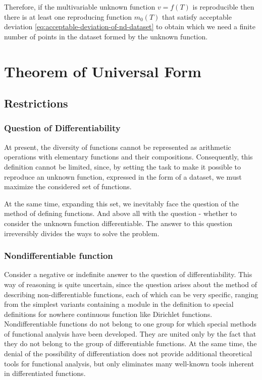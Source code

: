 \documentclass[a4paper, 11pt, oneside]{book}
\begin{document}
Therefore, if the multivariable unknown function $v = f(T)$ is reproducible then there is at least one reproducing function $m_0(T)$ that satisfy acceptable deviation \ref{eq:acceptable-deviation-of-nd-dataset} to obtain which we need a finite number of points in the dataset formed by the unknown function.

\chapter{Theorem of Universal Form}
\pagestyle{fancy}
\fancyhf{}
\lhead{\bfseries\leftmark}
\rhead{\bfseries\rightmark}
\fancyfoot{}
\fancyfoot[R]{\thepage}

\section{Restrictions}
\subsection{Question of Differentiability}
At present, the diversity of functions cannot be represented as arithmetic operations with elementary functions and their compositions. Consequently, this definition cannot be limited, since, by setting the task to make it possible to reproduce an unknown function, expressed in the form of a dataset, we must maximize the considered set of functions.

At the same time, expanding this set, we inevitably face the question of the method of defining functions. And above all with the question - whether to consider the unknown function differentiable. The answer to this question irreversibly divides the ways to solve the problem.

\subsection{Nondifferentiable function}
Consider a negative or indefinite answer to the question of differentiability.
This way of reasoning is quite uncertain, since the question arises about the method of describing non-differentiable functions, each of which can be very specific, ranging from the simplest variants containing a module in the definition to special definitions for nowhere continuous function like Dirichlet functions.
Nondifferentiable functions do not belong to one group for which special methods of functional analysis have been developed. They are united only by the fact that they do not belong to the group of differentiable functions. At the same time, the denial of the possibility of differentiation does not provide additional theoretical tools for functional analysis, but only eliminates many well-known tools inherent in differentiated functions.
\end{document}
